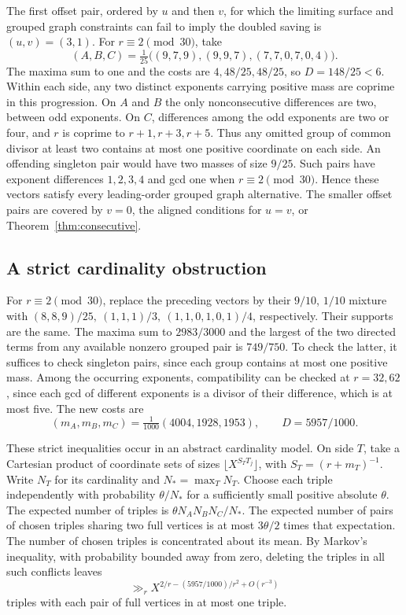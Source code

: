 \documentclass[11pt,reqno]{amsart}
\begin{document}
The first offset pair, ordered by \(u\) and then \(v\), for
which the limiting surface and grouped graph constraints can
fail to imply the doubled saving is \((u,v)=(3,1)\). For
\(r\equiv2\pmod{30}\), take
\[
       (A,B,C)=\tfrac1{25}\bigl((9,7,9),(9,9,7),(7,7,0,7,0,4)\bigr).
\]
The maxima sum to one and the costs are \(4,48/25,48/25\),
so \(D=148/25<6\).
Within each side, any two distinct exponents carrying positive
mass are coprime in this progression. On \(A\) and \(B\) the
only nonconsecutive differences are two, between odd exponents.
On \(C\), differences among the odd exponents are two or four,
and \(r\) is coprime to \(r+1,r+3,r+5\).
Thus any omitted group of common divisor at least two contains
at most one positive coordinate on each side. An offending
singleton pair would have two masses of size \(9/25\).
Such pairs have exponent differences \(1,2,3,4\) and gcd one
when \(r\equiv2\pmod{30}\). Hence these vectors satisfy every
leading-order grouped graph alternative. The smaller offset
pairs are covered by \(v=0\), the aligned conditions for \(u=v\),
or Theorem~\ref{thm:consecutive}.

\subsection{A strict cardinality obstruction}
For \(r\equiv2\pmod{30}\), replace the preceding vectors by their
\(9/10\), \(1/10\) mixture with
\((8,8,9)/25,\ (1,1,1)/3,\ (1,1,0,1,0,1)/4\), respectively.
Their supports are the same. The maxima sum to \(2983/3000\)
and the largest of the two directed terms from any available
nonzero grouped pair is \(749/750\). To check the latter, it
suffices to check singleton pairs, since each group contains
at most one positive mass. Among the occurring exponents,
compatibility can be checked at \(r=32,62\), since each gcd
of different exponents is a divisor of their difference,
which is at most five. The new costs are
\[
          (m_A,m_B,m_C)=\tfrac1{1000}(4004,1928,1953),\qquad
          D=5957/1000.
\]

These strict inequalities occur in an abstract cardinality model.
On side \(T\), take a Cartesian product of coordinate sets of
sizes \(\lfloor X^{S_T T_j}\rfloor\), with \(S_T=(r+m_T)^{-1}\).
Write \(N_T\) for its cardinality and \(N_*=\max_TN_T\).
Choose each triple independently with probability
\(\theta/N_*\) for a sufficiently small positive absolute
\(\theta\). The expected number of triples is
\(\theta N_A N_B N_C/N_*\).
The expected number of pairs of chosen triples sharing two
full vertices is at most \(3\theta/2\) times that expectation.
The number of chosen triples is concentrated about its mean.
By Markov's inequality, with probability bounded away from
zero, deleting the triples in all such conflicts leaves
\[
                 \gg_r X^{2/r-(5957/1000)/r^2+O(r^{-3})}
\]
triples with each pair of full vertices in at most one triple.
\end{document}
